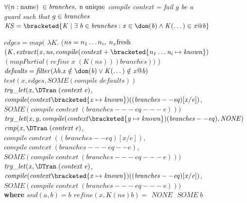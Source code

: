 \documentclass[manuscript,screen,review, 12pt, nonacm]{acmart}
\begin{document}
    
    
  
    \begin{figure}[H]
      \scriptsize
        \begin{algorithmic}
\Require $\forall (n : \rm{name})\; \in \mathit{branches}, \; n\; \rm{unique}$
\State \it{compile context \branches} = 
   {\it{fail}}
  \Else
    \State \alet $g$ be a guard such that $g \in \mathit{branches}$
    \ain 
    \alet 
    \State 
    $\mathit{KS = \bracketed{K\; \vert\; \exists\; b \in \branches : x \in \dom(b) \wedge K(\dots) \in x@b }}$ 
        
    $\mathit{edges = map(}$ 
    \State $\mathit{\lambda K.}$ (\alet $ns = n_1 \dots n_i, \; n_x \rm{ fresh}$
        \ain 
        \State $\mathit{(K, extract (x, ns, \compile (context + \bracketed{n_1 \dots n_i \mapsto known})}$ 
        \State $\mathit{(mapPartial (refine\; x\; (K (ns))) branches))}$ 
        \State \aend) 
      \State $\mathit{defaults = filter(\lambda b. x \notin \dom(b) \lor K(\dots) \notin x@b)}$ 
      \State \ain $\mathit{test (x, edges, SOME (compile\; defaults))}$ 
      \State \aend 
      \State $\mathit{try\_let (x, \DTran\; (context\; e)}$, 
      \State $\mathit{compile (context\bracketed{x \mapsto known}) ((branches -- eq)[x/e])}$,
      \State $\mathit{SOME (compile\; context\; (branches --- eq --- e)))}$
    \State $\mathit{try\_let (x, y, compile (context\bracketed{y \mapsto known}) (branches -- eq), NONE)}$
      \State $\mathit{cmp (x, \DTran\; (context\; e)}$, 
      \State $\mathit{compile\; context\; ((branches -- eq)[x/e])}$,
      \State $\mathit{compile\; context\; (branches --- eq -- e)}$,
      \State $\mathit{SOME (compile\; context\; (branches --- eq --- e)))}$
    \State $\mathit{try\_let (x, \DTran\; (context\; e)}$, 
    \State $\mathit{compile (context\bracketed{x \mapsto known}) ((branches -- eq)[x/e])}$,
    \State $\mathit{SOME (compile\; context\; (branches --- eq --- e)))}$ 
     \\
    \aend
    \EndIf
  \EndIf
  \State \bf{where} 
  \State $\mathit{snd (a, b) = b}$ 
  \State $\mathit{refine (x, K (ns) b) = }$
        $\mathit{NONE}$
  \Else $\;\mathit{SOME\; b}$
  \EndIf 


\end{algorithmic}
\end{figure}
\end{document}
